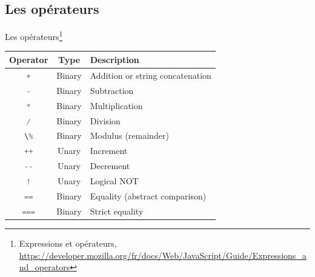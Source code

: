 \documentclass{beamer}
\begin{document}
    \subsection{Les opérateurs}\label{subsec:operators}
    \begin{frame}{Les opérateurs\footnote{\label{operators}Expressions et opérateurs, \url{https://developer.mozilla.org/fr/docs/Web/JavaScript/Guide/Expressions_and_operators}}}
        \begin{tiny}
            \begin{table}[h!]
                \centering
                \begin{tabular}{|c|c|p{8cm}|}
                    \hline
                    \textbf{Operator}                     & \textbf{Type} & \textbf{Description}             \\
                    \hline
                    \lstinline[language=Javascript]!+!    & Binary        & Addition or string concatenation \\
                    \hline
                    \lstinline[language=Javascript]!-!    & Binary        & Subtraction                      \\
                    \hline
                    \lstinline[language=Javascript]!*!    & Binary        & Multiplication                   \\
                    \hline
                    \lstinline[language=Javascript]!/!    & Binary        & Division                         \\
                    \hline
                    \lstinline[language=Javascript]!\%!   & Binary        & Modulus (remainder)              \\
                    \hline
                    \lstinline[language=Javascript]!++!   & Unary         & Increment                        \\
                    \hline
                    \lstinline[language=Javascript]!--!   & Unary         & Decrement                        \\
                    \hline
                    \lstinline[language=Javascript]|!|    & Unary         & Logical NOT                      \\
                    \hline
                    \lstinline[language=Javascript]!==!   & Binary        & Equality (abstract comparison)   \\
                    \hline
                    \lstinline[language=Javascript]!===!  & Binary        & Strict equality                  \\

\end{tabular}
\end{table}
\end{tiny}
\end{frame}
\end{document}
